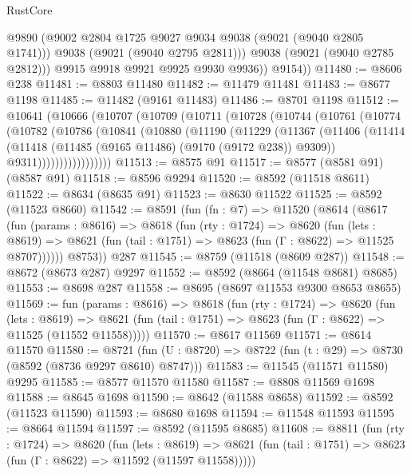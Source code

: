 \begin{lexlean}{RustCore}
\begin{coremodule}
                @9890
                (@9002 @2804 @1725 @9027 @9034 @9038 (@9021 (@9040 @2805 @1741)))
                @9038
                (@9021 (@9040 @2795 @2811)))
              @9038
              (@9021 (@9040 @2785 @2812)))
            @9915
            @9918
            @9921
            @9925
            @9930
            @9936))
        @9154))
@11480 := @8606 @238
@11481 := @8803 @11480
@11482 := @11479 @11481
@11483 := @8677 @1198
@11485 := @11482 (@9161 @11483)
@11486 := @8701 @1198
@11512 := @10641
    (@10666
      (@10707
        (@10709
          (@10711
            (@10728
              (@10744
                (@10761
                  (@10774
                    (@10782
                      (@10786
                        (@10841
                          (@10880
                            (@11190
                              (@11229
                                (@11367
                                  (@11406
                                    (@11414
                                      (@11418 (@11485 (@9165 @11486) (@9170 (@9172 @238)) @9309))
                                      @9311)))))))))))))))))
@11513 := @8575 @91
@11517 := @8577 (@8581 @91) (@8587 @91)
@11518 := @8596 @9294
@11520 := @8592 (@11518 @8611)
@11522 := @8634 (@8635 @91)
@11523 := @8630 @11522
@11525 := @8592 (@11523 @8660)
@11542 := @8591
    (fun (fn : @7) =>
    @11520
      (@8614
        (@8617
          (fun (params : @8616) =>
          @8618
            (fun (rty : @1724) =>
            @8620
              (fun (lets : @8619) =>
              @8621 (fun (tail : @1751) => @8623 (fun (Γ : @8622) => @11525 @8707))))))
        @8753))
    @287
@11545 := @8759 (@11518 (@8609 @287))
@11548 := @8672 (@8673 @287) @9297
@11552 := @8592 (@8664 (@11548 @8681) @8685)
@11553 := @8698 @287
@11558 := @8695 (@8697 @11553 @9300 @8653 @8655)
@11569 := fun (params : @8616) =>
  @8618
    (fun (rty : @1724) =>
    @8620
      (fun (lets : @8619) =>
      @8621 (fun (tail : @1751) => @8623 (fun (Γ : @8622) => @11525 (@11552 @11558)))))
@11570 := @8617 @11569
@11571 := @8614 @11570
@11580 := @8721
    (fun (U : @8720) => @8722 (fun (t : @29) => @8730 (@8592 (@8736 @9297 @8610) @8747)))
@11583 := @11545 (@11571 @11580) @9295
@11585 := @8577 @11570 @11580
@11587 := @8808 @11569 @1698
@11588 := @8645 @1698
@11590 := @8642 (@11588 @8658)
@11592 := @8592 (@11523 @11590)
@11593 := @8680 @1698
@11594 := @11548 @11593
@11595 := @8664 @11594
@11597 := @8592 (@11595 @8685)
@11608 := @8811
    (fun (rty : @1724) =>
    @8620
      (fun (lets : @8619) =>
      @8621 (fun (tail : @1751) => @8623 (fun (Γ : @8622) => @11592 (@11597 @11558)))))

\end{coremodule}
\end{lexlean}
